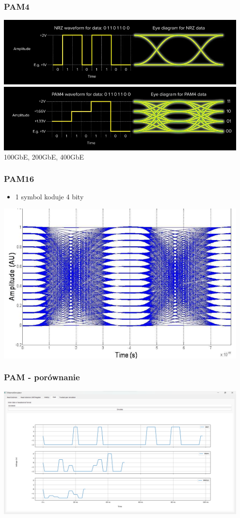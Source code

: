 \documentclass{beamer}
\begin{document}
\begin{frame}
\frametitle{PAM4}
\includegraphics[width=0.95\textwidth]{images/eye_diagram_nrz.png}
\includegraphics[width=0.95\textwidth]{images/eye_diagram_pam4.png}
100GbE, 200GbE, 400GbE
\end{frame}

\begin{frame}
\frametitle{PAM16}
\begin{itemize}
    \item 1 symbol koduje 4 bity
\end{itemize}
\includegraphics[width=0.95\textwidth]{images/eye_diagram_pam16.png}
\end{frame}

\begin{frame}
\frametitle{PAM - porównanie}
\includegraphics[width=0.95\textwidth]{images/prezentacja_pam.png}
\end{frame}
\end{document}
